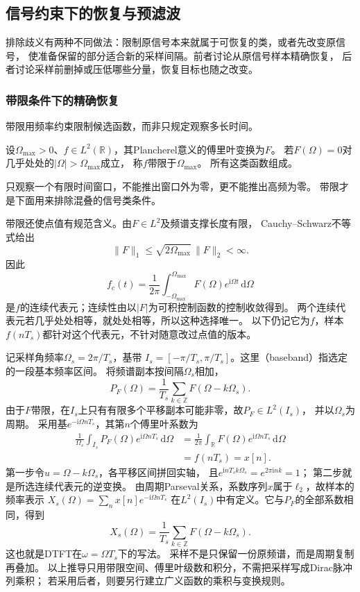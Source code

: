 \subsection{信号约束下的恢复与预滤波}

排除歧义有两种不同做法：限制原信号本来就属于可恢复的类，或者先改变原信号，
使准备保留的部分适合新的采样间隔。前者讨论从原信号样本精确恢复，
后者讨论采样前删掉或压低哪些分量，恢复目标也随之改变。

\subsubsection{带限条件下的精确恢复}
\label{sec:signal-bandlimited-recovery}

带限用频率约束限制候选函数，而非只规定观察多长时间。
\begin{definition}[平方可积带限信号]
  \label{def:signal-analysis-bandlimited-space}
  设$\Omega_{\max}>0$、$f\in L^2(\mathbb R)$，其Plancherel意义的傅里叶变换为$F$。
  若$F(\Omega)=0$对几乎处处的$|\Omega|>\Omega_{\max}$成立，
  称$f$带限于$\Omega_{\max}$。
  所有这类函数组成。
\end{definition}
只观察一个有限时间窗口，不能推出窗口外为零，更不能推出高频为零。
带限才是下面用来排除混叠的信号类条件。

带限还使点值有规范含义。由$F\in L^2$及频谱支撑长度有限，
Cauchy--Schwarz不等式给出
\[
  \|F\|_1\leq\sqrt{2\Omega_{\max}}\,\|F\|_2<\infty.
\]
因此
\[
  f_{\mathrm c}(t)=\frac1{2\pi}\int_{-\Omega_{\max}}^{\Omega_{\max}}
  F(\Omega)e^{\mathrm i\Omega t}\,\mathrm d\Omega
\]
是$f$的连续代表元；连续性由以$|F|$为可积控制函数的控制收敛得到。
两个连续代表元若几乎处处相等，就处处相等，所以这种选择唯一。
以下仍记它为$f$，样本$f(nT_s)$都针对这个代表元，不针对随意改过点值的版本。

记采样角频率$\Omega_s=2\pi/T_s$，基带
$I_s=[-\pi/T_s,\pi/T_s]$。这里（baseband）指选定的一段基本频率区间。
将频谱副本按间隔$\Omega_s$相加，
\[
  P_F(\Omega)=\frac1{T_s}\sum_{k\in\mathbb Z}F(\Omega-k\Omega_s).
\]
由于$F$带限，在$I_s$上只有有限多个平移副本可能非零，故$P_F\in L^2(I_s)$，
并以$\Omega_s$为周期。
采用基$e^{-\mathrm i\Omega nT_s}$，其第$n$个傅里叶系数为
\begin{align*}
  \frac1{\Omega_s}\int_{I_s}P_F(\Omega)e^{\mathrm i\Omega nT_s}\,\mathrm d\Omega
  &=\frac1{2\pi}\int_{\mathbb R}F(\Omega)e^{\mathrm i\Omega nT_s}\,\mathrm d\Omega\\
  &=f(nT_s)=x[n].
\end{align*}
第一步令$u=\Omega-k\Omega_s$，各平移区间拼回实轴，
且$e^{\mathrm inT_sk\Omega_s}=e^{2\pi\mathrm ink}=1$；
第二步就是所选连续代表元的逆变换。
由周期Parseval关系，系数序列$x$属于$\ell_2$，故样本的频率表示
$X_s(\Omega)=\sum_n x[n]e^{-\mathrm i\Omega nT_s}$
在$L^2(I_s)$中有定义。它与$P_F$的全部系数相同，得到
\begin{equation}
  X_s(\Omega)=\frac1{T_s}\sum_{k\in\mathbb Z}F(\Omega-k\Omega_s).
  \label{eq:signal-analysis-spectral-replication}
\end{equation}
这也就是DTFT在$\omega=\Omega T_s$下的写法。
采样不是只保留一份原频谱，而是周期复制再叠加。
以上推导只用带限空间、傅里叶级数和积分，不需把采样写成Dirac脉冲列乘积；
若采用后者，则要另行建立广义函数的乘积与变换规则。

